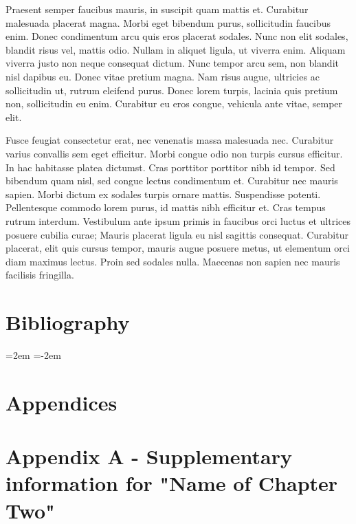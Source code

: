 \documentclass[]{article}
\numberwithin{equation}{section}
\begin{document}
Praesent semper faucibus mauris, in suscipit quam mattis et. Curabitur malesuada placerat magna. Morbi eget bibendum purus, sollicitudin faucibus enim. Donec condimentum arcu quis eros placerat sodales. Nunc non elit sodales, blandit risus vel, mattis odio. Nullam in aliquet ligula, ut viverra enim. Aliquam viverra justo non neque consequat dictum. Nunc tempor arcu sem, non blandit nisl dapibus eu. Donec vitae pretium magna. Nam risus augue, ultricies ac sollicitudin ut, rutrum eleifend purus. Donec lorem turpis, lacinia quis pretium non, sollicitudin eu enim. Curabitur eu eros congue, vehicula ante vitae, semper elit.

Fusce feugiat consectetur erat, nec venenatis massa malesuada nec. Curabitur varius convallis sem eget efficitur. Morbi congue odio non turpis cursus efficitur. In hac habitasse platea dictumst. Cras porttitor porttitor nibh id tempor. Sed bibendum quam nisl, sed congue lectus condimentum et. Curabitur nec mauris sapien. Morbi dictum ex sodales turpis ornare mattis. Suspendisse potenti. Pellentesque commodo lorem purus, id mattis nibh efficitur et. Cras tempus rutrum interdum. Vestibulum ante ipsum primis in faucibus orci luctus et ultrices posuere cubilia curae; Mauris placerat ligula eu nisl sagittis consequat. Curabitur placerat, elit quis cursus tempor, mauris augue posuere metus, ut elementum orci diam maximus lectus. Proin sed sodales nulla. Maecenas non sapien nec mauris facilisis fringilla.

\clearpage

\section*{Bibliography}

\noindent
\leftskip=2em
\parindent=-2em

\hypertarget{refs}{}

\clearpage

\setlength{\parindent}{4em} 
\linespread{1}
\doublespacing

\section*{Appendices}

\section*{Appendix A - Supplementary information for "Name of Chapter Two"}
\end{document}
